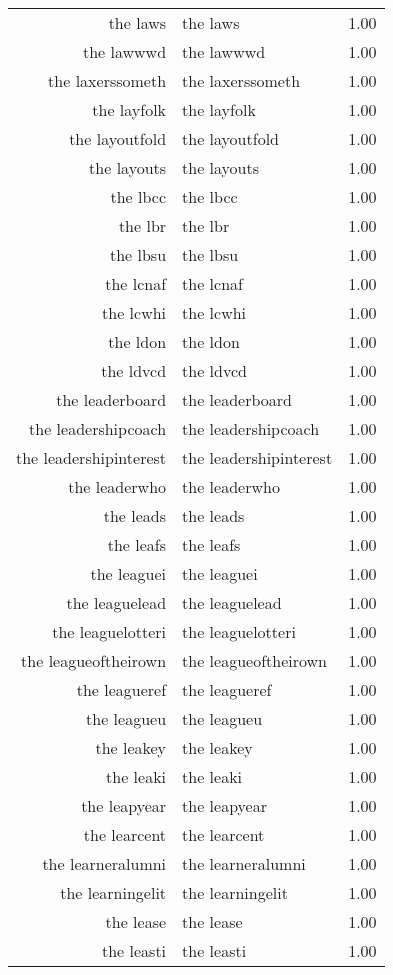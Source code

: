 \begin{table}[ht]
\begin{tabular}{rlr}
  the laws & the laws & 1.00 \\ 
  the lawwwd & the lawwwd & 1.00 \\ 
  the laxerssometh & the laxerssometh & 1.00 \\ 
  the layfolk & the layfolk & 1.00 \\ 
  the layoutfold & the layoutfold & 1.00 \\ 
  the layouts & the layouts & 1.00 \\ 
  the lbcc & the lbcc & 1.00 \\ 
  the lbr & the lbr & 1.00 \\ 
  the lbsu & the lbsu & 1.00 \\ 
  the lcnaf & the lcnaf & 1.00 \\ 
  the lcwhi & the lcwhi & 1.00 \\ 
  the ldon & the ldon & 1.00 \\ 
  the ldvcd & the ldvcd & 1.00 \\ 
  the leaderboard & the leaderboard & 1.00 \\ 
  the leadershipcoach & the leadershipcoach & 1.00 \\ 
  the leadershipinterest & the leadershipinterest & 1.00 \\ 
  the leaderwho & the leaderwho & 1.00 \\ 
  the leads & the leads & 1.00 \\ 
  the leafs & the leafs & 1.00 \\ 
  the leaguei & the leaguei & 1.00 \\ 
  the leaguelead & the leaguelead & 1.00 \\ 
  the leaguelotteri & the leaguelotteri & 1.00 \\ 
  the leagueoftheirown & the leagueoftheirown & 1.00 \\ 
  the leagueref & the leagueref & 1.00 \\ 
  the leagueu & the leagueu & 1.00 \\ 
  the leakey & the leakey & 1.00 \\ 
  the leaki & the leaki & 1.00 \\ 
  the leapyear & the leapyear & 1.00 \\ 
  the learcent & the learcent & 1.00 \\ 
  the learneralumni & the learneralumni & 1.00 \\ 
  the learningelit & the learningelit & 1.00 \\ 
  the lease & the lease & 1.00 \\ 
  the leasti & the leasti & 1.00 \\ 

\end{tabular}
\end{table}
